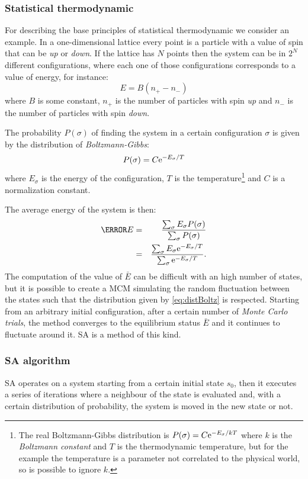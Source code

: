 \documentclass[dissertation.tex]{subfiles}
\begin{document}
\subsubsection{Statistical thermodynamic}
For describing the base principles of statistical thermodynamic we
consider an example. In a one-dimensional lattice every point
is a particle with a value of spin that can be \emph{up} or
\emph{down}. If the lattice has $N$ points then the system can be in
$2^N$ different configurations, where each one of those configurations
corresponds to a value of energy, for instance:
\begin{equation*}
  E=B(n_+-n_-)
\end{equation*}
where $B$ is some constant, $n_+$ is the number of particles with spin
\emph{up} and $n_-$ is the number of particles with spin \emph{down}.

The probability $P(\sigma)$ of finding the system in a certain
configuration $\sigma$ is given by the distribution of
\emph{Boltzmann-Gibbs}:
\begin{equation}\label{eq:distBoltz}
  P(\sigma) = C \mathrm{e}^{-E_\sigma/T}
\end{equation}
where $E_\sigma$ is the energy of the configuration, $T$ is the
temperature\footnote{The real Boltzmann-Gibbs distribution is
  $P(\sigma) = C \mathrm{e}^{-E_\sigma/kT}$ where $k$ is the \emph{Boltzmann
    constant} and $T$ is the thermodynamic temperature, but for the
  example the temperature is a parameter not correlated to the
  physical world, so is possible to ignore $k$.} and $C$ is a
normalization constant.

The average energy of the system is then:
\begin{eqnarray*}
  \bar{E} &=& \frac{\sum_\sigma E_\sigma P(\sigma)}{\sum_\sigma
    P(\sigma)}\\
  &=& \frac{\sum_\sigma E_\sigma \me^{-E_\sigma/T}}{\sum_\sigma \me^{-E_\sigma/T}}.
\end{eqnarray*}
The computation of the value of $\bar{E}$ can be difficult with an
high number of 
states, but it is possible to create a \ac{MCM} simulating the random
fluctuation between the states such that the distribution given by
\cref{eq:distBoltz} is respected. Starting from an arbitrary initial
configuration, after a certain number of \emph{Monte Carlo trials},
the method converges to the equilibrium status $\bar{E}$ and it
continues
to fluctuate around it. \ac{SA} is a method of this kind.

\subsubsection{\acf{SA} algorithm}
\ac{SA} operates on a system starting from a certain initial state
$s_0$, then it executes a series of iterations where a
neighbour of the state is evaluated and, with a certain distribution
of probability, the system is moved in the new state or not.
\end{document}
